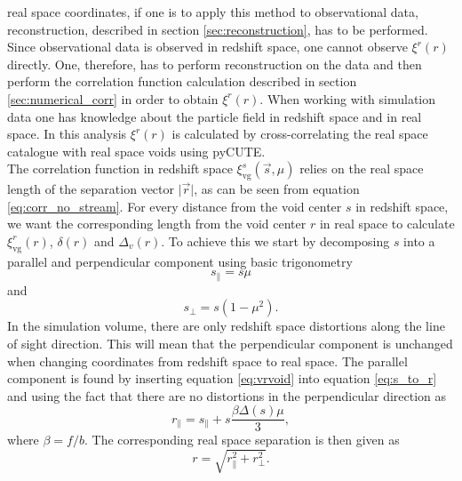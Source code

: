 real space coordinates, if one is to apply this method to observational data,
reconstruction, described in section \ref{sec:reconstruction}, has to be performed. Since observational data is observed in
redshift space, one cannot observe $\xi^r(r)$ directly. One, therefore, has to
perform reconstruction on the data and then perform the correlation function
calculation described in section \ref{sec:numerical_corr} in order to obtain
$\xi^r(r)$. When working with simulation data one has knowledge about the
particle field in redshift space and in real space. In this analysis $\xi^r(r)$ is calculated by cross-correlating the real space catalogue with real space voids using pyCUTE. 
\\\indent
The correlation function in redshift space $\xi^s_{\mathrm{vg}}(\vec{s},\mu)$
relies on the real space length of the separation vector $\vert\vec{r}\vert$, as
can be seen from equation \ref{eq:corr_no_stream}. For every distance from the void center $s$ in
redshift space, we want the corresponding length from the void center $r$ in
real space to calculate $\xi^r_{\mathrm{vg}}(r)$, $\delta(r)$ and $\Delta_v(r)$.
To achieve this we start by decomposing $s$ into a parallel and perpendicular
component using basic trigonometry
\begin{equation}
    s_\parallel=s\mu
\end{equation}
and
\begin{equation}
    s_\perp=s(1-\mu^2).
\end{equation}
In the simulation volume, there are only redshift space distortions along the line
of sight direction. This will mean that the perpendicular component is unchanged
when changing coordinates from redshift space to real space. The parallel
component is found by inserting equation \ref{eq:vrvoid} into equation \ref{eq:s_to_r} and using the fact that there are no distortions in the perpendicular direction as
\begin{equation}
    r_\parallel=s_\parallel + s\frac{\beta\Delta(s)\mu}{3},
\end{equation}
where $\beta=f/b$.
The corresponding real space separation is then given as
\begin{equation}
    r=\sqrt{r_\parallel^2+r_\perp^2}.
\end{equation}
